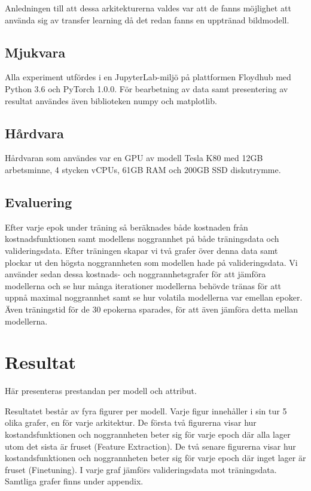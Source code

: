 \documentclass[]{kththesis}
\begin{document}
Anledningen till att dessa arkitekturerna valdes var att de fanns möjlighet att använda sig av transfer learning då det redan fanns en upptränad bildmodell.

\section{Mjukvara}
Alla experiment utfördes i en JupyterLab-miljö på plattformen Floydhub \parencite{floydhub} med Python 3.6 och PyTorch 1.0.0. För bearbetning av data samt presentering av resultat användes även biblioteken numpy och matplotlib.

\section{Hårdvara}
Hårdvaran som användes var en GPU av modell Tesla K80 med 12GB arbetsminne, 4 stycken vCPUs, 61GB RAM och 200GB SSD diskutrymme.

\section{Evaluering}
Efter varje epok under träning så beräknades både kostnaden från kostnadsfunktionen samt modellens noggrannhet på både träningsdata och valideringsdata. Efter träningen skapar vi två grafer över denna data samt plockar ut den högsta noggrannheten som modellen hade på valideringsdata. Vi använder sedan dessa kostnads- och noggrannhetsgrafer för att jämföra modellerna och se hur många iterationer modellerna behövde tränas för att uppnå maximal noggrannhet samt se hur volatila modellerna var emellan epoker. Även träningstid för de 30 epokerna sparades, för att även jämföra detta mellan modellerna.

\chapter{Resultat}
Här presenteras prestandan per modell och attribut.

Resultatet består av fyra figurer per modell. 
Varje figur innehåller i sin tur 5 olika grafer, en för varje arkitektur.
De första två figurerna visar hur kostandsfunktionen och noggrannheten beter sig för varje epoch där alla lager utom det sista är fruset (Feature Extraction).
De två senare figurerna visar hur kostandsfunktionen och noggrannheten beter sig för varje epoch där inget lager är fruset (Finetuning).
I varje graf jämförs valideringsdata mot träningsdata. Samtliga grafer finns under appendix.
\end{document}
